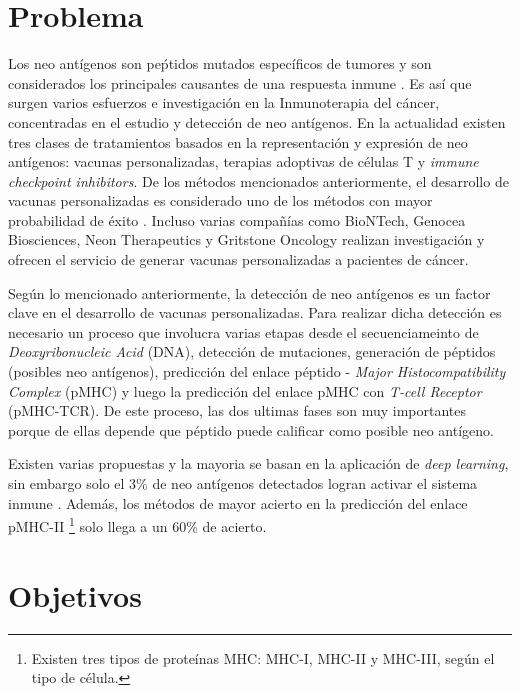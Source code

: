 \section{Problema}
\label{sec:problema}

Los neo antígenos son peṕtidos mutados específicos de tumores y son considerados los principales causantes de una respuesta inmune \citep{borden2022cancer, chen2021challenges, gopanenko2020main}. Es así que surgen varios esfuerzos e investigación en la Inmunoterapia del cáncer, concentradas en el estudio y detección de neo antígenos. En la actualidad existen tres clases de tratamientos basados en la representación y expresión de neo antígenos: vacunas personalizadas, terapias adoptivas de células T y \textit{immune checkpoint inhibitors}. De los métodos mencionados anteriormente, el desarrollo de vacunas personalizadas es considerado uno de los métodos con mayor probabilidad de éxito \citep{borden2022cancer}. Incluso varias compañías como BioNTech, Genocea Biosciences, Neon Therapeutics y Gritstone Oncology realizan investigación y ofrecen el servicio de generar vacunas personalizadas a pacientes de cáncer.

Según lo mencionado anteriormente, la detección de neo antígenos es un factor clave en el desarrollo de vacunas personalizadas. Para realizar dicha detección es necesario un proceso que involucra varias etapas desde el secuenciameinto de \textit{Deoxyribonucleic Acid} (DNA), detección de mutaciones, generación de péptidos (posibles neo antígenos), predicción del enlace péptido - \textit{Major Histocompatibility Complex} (pMHC) y luego la predicción del enlace pMHC con \textit{T-cell Receptor} (pMHC-TCR). De este proceso, las dos ultimas fases son muy importantes porque de ellas depende que péptido puede calificar como posible neo antígeno. 



Existen varias propuestas y la mayoria se basan en la aplicación de \textit{deep learning}, sin embargo solo el 3\% de neo antígenos detectados logran activar el sistema inmune \citep{de2020neoantigen}. Además, los métodos de mayor acierto en la predicción del enlace pMHC-II \footnote{Existen tres tipos de proteínas MHC: MHC-I, MHC-II y MHC-III, según el tipo de célula.} solo llega a un 60\% de acierto.



\section{Objetivos}
\label{sec:objetivos}


